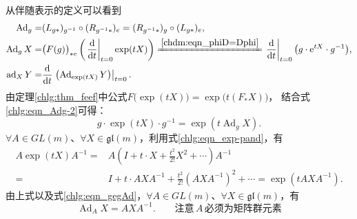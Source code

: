 从伴随表示的定义可以看到
\begin{align}
    \operatorname{Ad}_{g} =& (L_{g*})_{g^{-1}} \circ (R_{g^{-1}*})_{e}
     = (R_{g^{-1}*})_{g}\circ (L_{g*})_{e}, \\
    \operatorname{Ad}_{g}X =& \bigl(F(g)\bigr)_{*e} \left( \left.\frac{\d }{\d t}\right|_{t=0} \exp(t X)\right)
\xlongequal{\ref{chdm:eqn_phiD=Dphi}}\left.\frac{\d }{\d t}\right|_{t=0}
\bigl(g \cdot \e^{tX} \cdot g^{-1}\bigr),  \label{chlg:eqn_Adg-2} \\
    \operatorname{ad}_{X}Y =& \frac{\d }{\d t}\left.\bigl(\operatorname{Ad}_{\exp(t X)} Y
      \bigr)\right|_{t=0}. \label{chlg:eqn_Adg-3}
\end{align}
由定理\ref{chlg:thm_feef}中公式$F\bigl(\exp (tX)\bigr) = \exp \bigl(t (F_{*} X)\bigr)$，
结合式\eqref{chlg:eqn_Adg-2}可得：
\begin{equation}\label{chlg:eqn_gegAd}
    g \cdot \exp(tX) \cdot g^{-1} =  \exp (t \operatorname{Ad}_g X) .
\end{equation}
$\forall A\in GL(m)$、$\forall X\in \mathfrak{gl}(m)$，利用式\eqref{chlg:eqn_exp-pand}，有
\begin{align*}
    A \exp(t X) A^{-1} =& A\left( I + t\cdot X + \frac{t^2}{2!} X^2 + \cdots\right) A^{-1}\\
    =& I + t\cdot A X A^{-1} + \frac{t^2}{2!} (A X A^{-1})^2 + \cdots
    =\exp(t A X A^{-1}) .
\end{align*}
由上式以及式\eqref{chlg:eqn_gegAd}，$\forall A\in GL(m)$、$\forall X\in \mathfrak{gl}(m)$，有
\begin{equation}
    \operatorname{Ad}_A X = A X A^{-1}. \qquad \text{注意}\, A \, \text{必须为矩阵群元素}
\end{equation}

